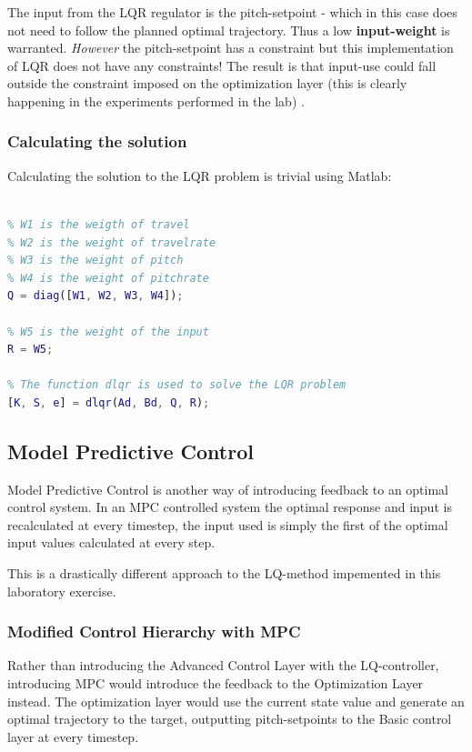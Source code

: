 \documentclass[../main.tex]{subfiles}
\begin{document}
The input from the LQR regulator is the pitch-setpoint - which in this case does not need to follow the planned optimal trajectory. Thus a low \textbf{input-weight} is warranted. \textit{However} the pitch-setpoint has a constraint but this implementation of LQR does not have any constraints! The result is that input-use could fall outside the constraint imposed on the optimization layer (this is clearly happening in the experiments performed in the lab) .

\subsubsection{Calculating the solution}
Calculating the solution to the LQR problem is trivial using Matlab:
\begin{lstlisting}[language=Matlab]
% The discrete system described as a state space system, Ad and Bd must be defined

% W1 is the weigth of travel
% W2 is the weight of travelrate
% W3 is the weight of pitch
% W4 is the weight of pitchrate
Q = diag([W1, W2, W3, W4]);

% W5 is the weight of the input
R = W5;

% The function dlqr is used to solve the LQR problem
[K, S, e] = dlqr(Ad, Bd, Q, R);
\end{lstlisting}

\subsection{Model Predictive Control}\label{kap:10_3_mpc}
Model Predictive Control is another way of introducing feedback to an optimal control system. In an MPC controlled system the optimal response and input is recalculated at every timestep, the input used is simply the first of the optimal input values calculated at every step.

This is a drastically different approach to the LQ-method impemented in this laboratory exercise.

\subsubsection{Modified Control Hierarchy with MPC}
Rather than introducing the Advanced Control Layer with the LQ-controller, introducing MPC would introduce the feedback to the Optimization Layer instead. The optimization layer would use the current state value and generate an optimal trajectory to the target, outputting pitch-setpoints to the Basic control layer at every timestep.
\end{document}
